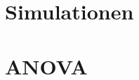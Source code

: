 \documentclass[handout,aspectratio=1610,dvipsnames]{beamer}
\begin{document}
  \section{Simulationen}

  \section{ANOVA}
  \let\woopsi\section\let\section\subsection\let\subsection\subsubsection
  
  \let\subsection\section\let\section\woopsi
\end{document}
